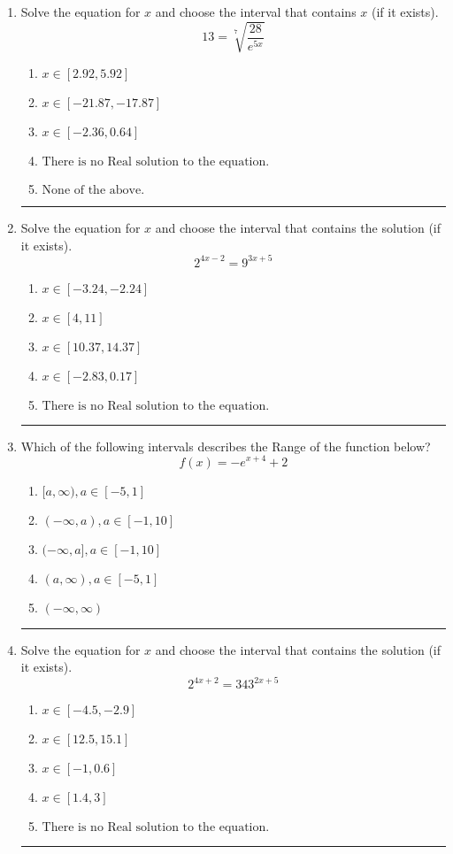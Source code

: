 \documentclass[14pt]{extbook}
\newcommand{\litem}[1]{\item#1\hspace*{-1cm}\rule{\textwidth}{0.4pt}}
\begin{document}
\begin{enumerate}
\litem{
 Solve the equation for $x$ and choose the interval that contains $x$ (if it exists).\[  13 = \sqrt[7]{\frac{28}{e^{5x}}} \]\begin{enumerate}[label=\Alph*.]
\item \( x \in [2.92, 5.92] \)
\item \( x \in [-21.87, -17.87] \)
\item \( x \in [-2.36, 0.64] \)
\item \( \text{There is no Real solution to the equation.} \)
\item \( \text{None of the above.} \)

\end{enumerate} }
\litem{
Solve the equation for $x$ and choose the interval that contains the solution (if it exists).\[ 2^{4x-2} = 9^{3x+5} \]\begin{enumerate}[label=\Alph*.]
\item \( x \in [-3.24, -2.24] \)
\item \( x \in [4, 11] \)
\item \( x \in [10.37, 14.37] \)
\item \( x \in [-2.83, 0.17] \)
\item \( \text{There is no Real solution to the equation.} \)

\end{enumerate} }
\litem{
Which of the following intervals describes the Range of the function below?\[ f(x) = -e^{x+4}+2 \]\begin{enumerate}[label=\Alph*.]
\item \( [a, \infty), a \in [-5, 1] \)
\item \( (-\infty, a), a \in [-1, 10] \)
\item \( (-\infty, a], a \in [-1, 10] \)
\item \( (a, \infty), a \in [-5, 1] \)
\item \( (-\infty, \infty) \)

\end{enumerate} }
\litem{
Solve the equation for $x$ and choose the interval that contains the solution (if it exists).\[ 2^{4x+2} = 343^{2x+5} \]\begin{enumerate}[label=\Alph*.]
\item \( x \in [-4.5, -2.9] \)
\item \( x \in [12.5, 15.1] \)
\item \( x \in [-1, 0.6] \)
\item \( x \in [1.4, 3] \)
\item \( \text{There is no Real solution to the equation.} \)


\end{enumerate}}
\end{enumerate}
\end{document}
